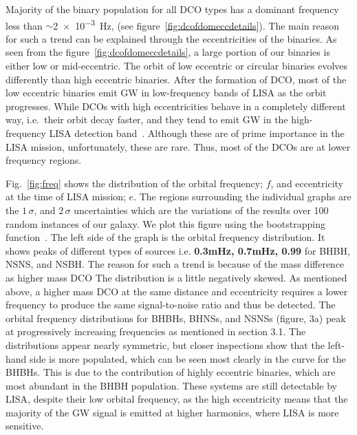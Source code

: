 \documentclass[journal, twocolumn]{IEEEtran}
\begin{document}
    Majority of the binary population for all DCO types has a dominant frequency less than $\sim$\SI{2e-3}{\hertz}, (see figure~\ref{fig:dcofdomeccdetails}).
    The main reason for such a trend can be explained through the eccentricities of the binaries.
    As seen from the figure~\ref{fig:dcofdomeccdetails}, a large portion of our binaries is either low or mid-eccentric.
    The orbit of low eccentric or circular binaries evolves differently than high eccentric binaries.
    After the formation of DCO, most of the low eccentric binaries emit GW in low-frequency bands of LISA as the orbit progresses.
    While DCOs with high eccentricities behave in a completely different way, i.e.\ their orbit decay faster, and they tend to emit GW in the high-frequency LISA detection band~\cite{Peters1963, Peters1964}.
    Although these are of prime importance in the LISA mission, unfortunately, these are rare.
    Thus, most of the DCOs are at lower frequency regions.
    
    Fig.~\ref{fig:freq} shows the distribution of the orbital frequency; $f$, and eccentricity at the time of LISA mission; $e$.
    The regions surrounding the individual graphs are the $1\,\sigma$, and $2\,\sigma$ uncertainties which are the variations of the results over 100 random instances of our galaxy.
    We plot this figure using the bootstrapping function~\cite{wagg2021gravitational}.
    The left side of the graph is the orbital frequency distribution.
    It shows peaks of different types of sources i.e. \textbf{0.3mHz, 0.7mHz, 0.99} for BHBH, NSNS, and NSBH\@.
    The reason for such a trend is because of the mass difference as higher mass DCO The distribution is a little negatively skewed.
    As mentioned above, a higher mass DCO at the same distance and eccentricity requires a lower frequency to produce the same signal-to-noise ratio and thus be detected.
    The orbital frequency distributions for BHBHs, BHNSs, and NSNSs (figure, 3a) peak at progressively increasing frequencies as mentioned in section 3.1.
    The distributions appear nearly symmetric, but closer inspections show that the left-hand side is more populated, which can be seen most clearly in the curve for the BHBHs.
    This is due to the contribution of highly eccentric binaries, which are most abundant in the BHBH population.
    These systems are still detectable by LISA, despite their low orbital frequency, as the high eccentricity means that the majority of the GW signal is emitted at higher harmonics, where LISA is more sensitive.
    
\end{document}
